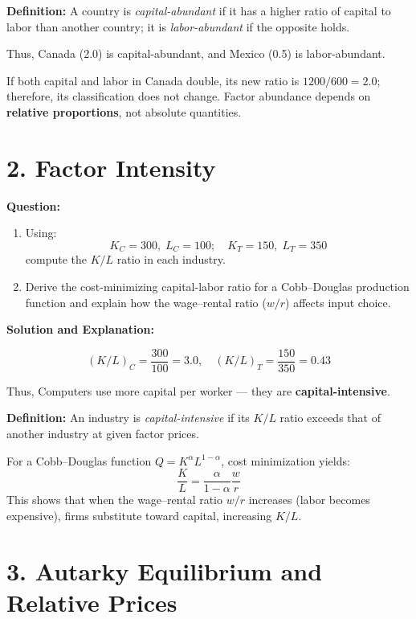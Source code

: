 \documentclass[12pt]{article}
\begin{document}
\noindent
\textbf{Definition:}  
A country is \emph{capital-abundant} if it has a higher ratio of capital to labor than another country; it is \emph{labor-abundant} if the opposite holds.

\noindent
Thus, Canada (2.0) is capital-abundant, and Mexico (0.5) is labor-abundant.

\noindent
If both capital and labor in Canada double, its new ratio is \(1200/600 = 2.0\); therefore, its classification does not change.  
Factor abundance depends on \textbf{relative proportions}, not absolute quantities.

\section*{2. Factor Intensity}

\noindent\textbf{Question:}
\begin{enumerate}
    \item Using:
    \[
    K_C = 300, \; L_C = 100; \quad K_T = 150, \; L_T = 350
    \]
    compute the \(K/L\) ratio in each industry.
    \item Derive the cost-minimizing capital-labor ratio for a Cobb–Douglas production function and explain how the wage–rental ratio (\(w/r\)) affects input choice.
\end{enumerate}

\noindent\textbf{Solution and Explanation:}

\[
(K/L)_C = \frac{300}{100} = 3.0, \quad (K/L)_T = \frac{150}{350} = 0.43
\]

\noindent
Thus, Computers use more capital per worker — they are \textbf{capital-intensive}.

\noindent
\textbf{Definition:}  
An industry is \emph{capital-intensive} if its \(K/L\) ratio exceeds that of another industry at given factor prices.

\noindent
For a Cobb–Douglas function \(Q = K^\alpha L^{1-\alpha}\), cost minimization yields:
\[
\frac{K}{L} = \frac{\alpha}{1-\alpha}\frac{w}{r}
\]
This shows that when the wage–rental ratio \(w/r\) increases (labor becomes expensive), firms substitute toward capital, increasing \(K/L\).
\newpage
\section*{3. Autarky Equilibrium and Relative Prices}
\end{document}
